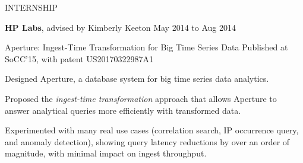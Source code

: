 \documentclass{resume} %
\begin{document}
\begin{rSection}{INTERNSHIP}

\hspace{-1em} \textbf{HP Labs}, advised by Kimberly Keeton \hfill {May 2014 to Aug 2014}

\vspace{-.1in}
\begin{rSubsection}{\hspace{-1em} Aperture: Ingest-Time Transformation for Big Time Series Data}{}
{Published at SoCC'15, with patent US20170322987A1}{}
\vspace{-0.3em}
\item Designed Aperture, a database system for big time series data analytics.
\item Proposed the \emph{ingest-time transformation} approach that allows Aperture to answer analytical queries more efficiently with transformed data.
\item Experimented with many real use cases (correlation search, IP occurrence query, and anomaly detection), showing query latency reductions by over an order of magnitude, with minimal impact on ingest throughput.
\end{rSubsection}

\end{rSection}
\vspace{-.05in}
\end{document}

